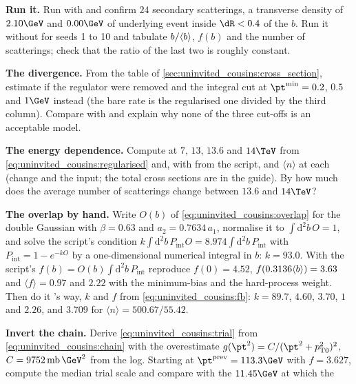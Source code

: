 \begin{exercises}
\item \textbf{Run it.} Run 
  with  and confirm $24$ secondary scatterings, a
  transverse density of $2.10\GeV$ and $0.00\GeV$ of underlying event
  inside $\dR<0.4$ of the $b$. Run it without  for seeds 1
  to 10 and tabulate $b/\langle b\rangle$, $f(b)$ and the number of scatterings;
  check that the ratio of the last two is roughly constant.
\item \textbf{The divergence.} From the table of
  \cref{sec:uninvited_cousins:cross_section}, estimate \sigint if the
  regulator were removed and the integral cut at $\pt^{\min}=0.2$, $0.5$
  and $1\GeV$ instead (the bare rate is the regularised one divided by the
  third column). Compare with \signd and explain why none of the three
  cut-offs is an acceptable model.
\item \textbf{The energy dependence.} Compute \ptzero at $7$, $13$, $13.6$
  and $14\TeV$ from \cref{eq:uninvited_cousins:regularised} and, with
   from the script, \sigint and $\langle n\rangle$ at each
  (change  and the  input; the total cross
  sections are in the \PYTHIA guide). By how much does the average number
  of scatterings change between $13.6$ and $14\TeV$?
\item \textbf{The overlap by hand.} Write $O(b)$ of
  \cref{eq:uninvited_cousins:overlap} for the double Gaussian with
  $\beta=0.63$ and $a_2=0.7634\,a_1$, normalise it to $\int\mathrm{d}^2b\,O=1$,
  and solve the script's condition
  $k\int\mathrm{d}^2b\,P_{\mathrm{int}}O=8.974\int\mathrm{d}^2b\,P_{\mathrm{int}}$
  with $P_{\mathrm{int}}=1-e^{-kO}$ by a one-dimensional numerical integral
  in $b$: $k=93.0$. With the script's $f(b)=O(b)\int\mathrm{d}^2b\,P_{\mathrm{int}}$
  reproduce $f(0)=4.52$, $f(0.3136\langle b\rangle)=3.63$ and $\langle f\rangle=0.97$
  and $2.22$ with the minimum-bias and the hard-process weight. Then do it
  \PYTHIA's way, $k$ and $f$ from \cref{eq:uninvited_cousins:fb}: $k=89.7$,
  $4.60$, $3.70$, $1$ and $2.26$, and $3.709$ for $\langle n\rangle=500.67/55.42$.
\item \textbf{Invert the chain.} Derive \cref{eq:uninvited_cousins:trial}
  from \cref{eq:uninvited_cousins:chain} with the overestimate
  $g(\pt^2)=C/(\pt^2+\ptzero^2)^2$, $C=9752\,\mathrm{mb}\,\GeV^2$ from the
  log. Starting at $\pt^{\mathrm{prev}}=113.3\GeV$ with $f=3.627$, compute
  the median trial scale and compare with the $11.45\GeV$ at which the

\end{exercises}
